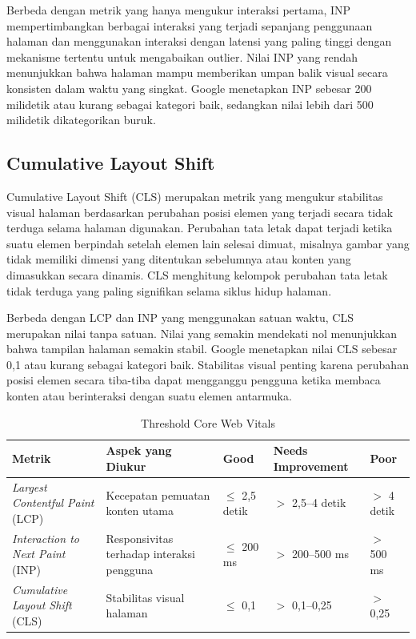 \documentclass[12pt,a4paper]{report}
\begin{document}
Berbeda dengan metrik yang hanya mengukur interaksi pertama, INP mempertimbangkan berbagai interaksi yang terjadi sepanjang penggunaan halaman dan menggunakan interaksi dengan latensi yang paling tinggi dengan mekanisme tertentu untuk mengabaikan outlier. Nilai INP yang rendah menunjukkan bahwa halaman mampu memberikan umpan balik visual secara konsisten dalam waktu yang singkat. Google menetapkan INP sebesar 200 milidetik atau kurang sebagai kategori baik, sedangkan nilai lebih dari 500 milidetik dikategorikan buruk.

\subsection{Cumulative Layout Shift}
Cumulative Layout Shift (CLS) merupakan metrik yang mengukur stabilitas visual halaman berdasarkan perubahan posisi elemen yang terjadi secara tidak terduga selama halaman digunakan. Perubahan tata letak dapat terjadi ketika suatu elemen berpindah setelah elemen lain selesai dimuat, misalnya gambar yang tidak memiliki dimensi yang ditentukan sebelumnya atau konten yang dimasukkan secara dinamis. CLS menghitung kelompok perubahan tata letak tidak terduga yang paling signifikan selama siklus hidup halaman.

Berbeda dengan LCP dan INP yang menggunakan satuan waktu, CLS merupakan nilai tanpa satuan. Nilai yang semakin mendekati nol menunjukkan bahwa tampilan halaman semakin stabil. Google menetapkan nilai CLS sebesar 0,1 atau kurang sebagai kategori baik. Stabilitas visual penting karena perubahan posisi elemen secara tiba-tiba dapat mengganggu pengguna ketika membaca konten atau berinteraksi dengan suatu elemen antarmuka.

\begin{table}[H]
\centering
\caption{Threshold Core Web Vitals}
\small
\begin{tabularx}{\textwidth}{|L{3.4cm}|Y|C{1.7cm}|C{2.5cm}|C{1.7cm}|}
\hline
\textbf{Metrik} & \textbf{Aspek yang Diukur} & \textbf{Good} & \textbf{Needs Improvement} & \textbf{Poor} \\
\hline
\textit{Largest Contentful Paint} (LCP) & Kecepatan pemuatan konten utama & $\leq$ 2,5 detik & $>$ 2,5--4 detik & $>$ 4 detik \\
\hline
\textit{Interaction to Next Paint} (INP) & Responsivitas terhadap interaksi pengguna & $\leq$ 200 ms & $>$ 200--500 ms & $>$ 500 ms \\
\hline
\textit{Cumulative Layout Shift} (CLS) & Stabilitas visual halaman & $\leq$ 0,1 & $>$ 0,1--0,25 & $>$ 0,25 \\
\hline
\end{tabularx}
\end{table}
\end{document}
